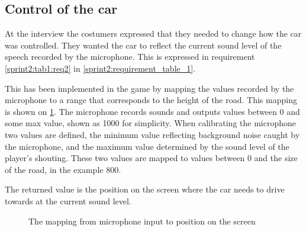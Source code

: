 \subsection{Control of the car}\label{sprint2:car_control}
At the interview the costumers expressed that they needed to change how the car was controlled.
They wanted the car to reflect the current sound level of the speech recorded by the microphone.
This is expressed in requirement \ref{sprint2:tab1:req2} in \cref{sprint2:requirement_table_1}.

This has been implemented in the game by mapping the values recorded by the microphone to a range that corresponds to the height of the road.
This mapping is shown on \cref{mapping}.
The microphone records sounds and outputs values between 0 and some max value, shown as 1000 for simplicity.
When calibrating the microphone two values are defined, the minimum value reflecting background noise caught by the microphone, and the maximum value determined by the sound level of the player's shouting.
These two values are mapped to values between 0 and the size of the road, in the example 800.

The returned value is the position on the screen where the car needs to drive towards at the current sound level.

\begin{figure}
\centering

\caption{The mapping from microphone input to position on the screen}
\label{mapping}
\end{figure}
